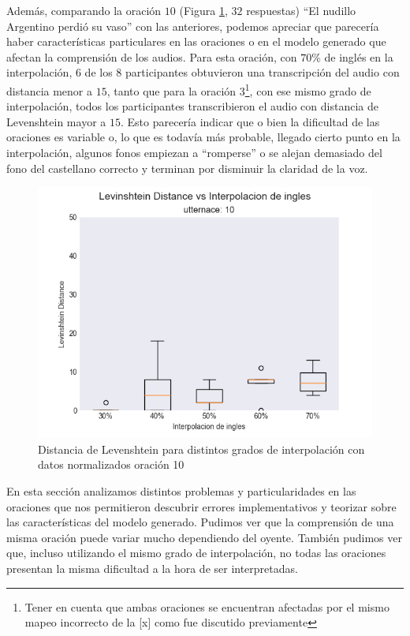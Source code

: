 
Además, comparando la oración $10$ (Figura \ref{boxplot:fig10}, $32$ respuestas) ``El nudillo Argentino perdió su vaso'' con las anteriores, podemos apreciar que parecería haber características particulares en las oraciones o en el modelo generado que afectan la comprensión de los audios. Para esta oración, con $70\%$ de inglés en la interpolación, $6$ de los $8$ participantes obtuvieron una transcripción del audio con distancia menor a $15$, tanto que para la oración $3$\footnote{Tener en cuenta que ambas oraciones se encuentran afectadas por el mismo mapeo incorrecto de la [x] como fue discutido previamente}, con ese mismo grado de interpolación, todos los participantes transcribieron el audio con distancia de Levenshtein mayor a $15$. Esto parecería indicar que o bien la dificultad de las oraciones es variable o, lo que es todavía más probable, llegado cierto punto en la interpolación, algunos fonos empiezan a ``romperse'' o se alejan demasiado del fono del castellano correcto y terminan por disminuir la claridad de la voz.

\begin{figure}
\begin{center}
\includegraphics[trim={0 0 0 1.25cm},clip,width=.5\textwidth]{imagenes/plots_normalized/10.png}
\end{center}
\caption{Distancia de Levenshtein para distintos grados de interpolación con datos normalizados oración 10}
\label{boxplot:fig10}
\end{figure}

En esta sección analizamos distintos problemas y particularidades en las oraciones que nos permitieron descubrir errores implementativos y teorizar sobre las características del modelo generado. Pudimos ver que la comprensión de una misma oración puede variar mucho dependiendo del oyente. También pudimos ver que, incluso utilizando el mismo grado de interpolación, no todas las oraciones presentan la misma dificultad a la hora de ser interpretadas.

